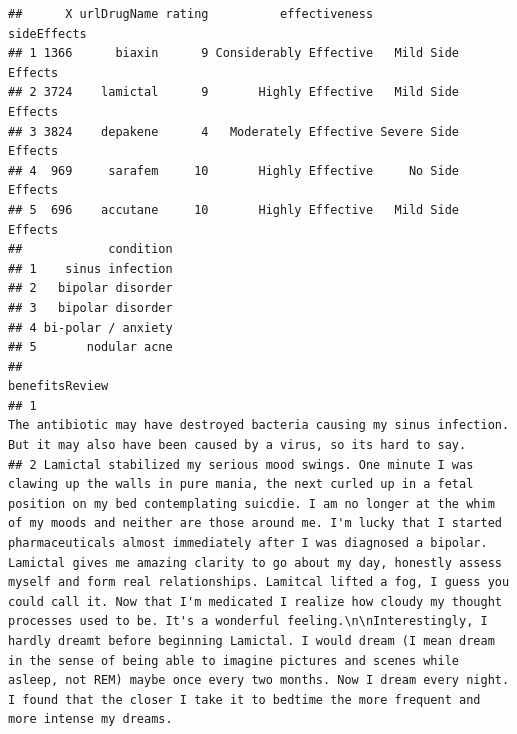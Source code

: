 \documentclass[spanish,]{article}
\begin{document}
\begin{verbatim}
##      X urlDrugName rating          effectiveness         sideEffects
## 1 1366      biaxin      9 Considerably Effective   Mild Side Effects
## 2 3724    lamictal      9       Highly Effective   Mild Side Effects
## 3 3824    depakene      4   Moderately Effective Severe Side Effects
## 4  969     sarafem     10       Highly Effective     No Side Effects
## 5  696    accutane     10       Highly Effective   Mild Side Effects
##            condition
## 1    sinus infection
## 2   bipolar disorder
## 3   bipolar disorder
## 4 bi-polar / anxiety
## 5       nodular acne
##                                                                                                                                                                                                                                                                                                                                                                                                                                                                                                                                                                                                                                                                                                                                                                                                                                                                                                                                benefitsReview
## 1                                                                                                                                                                                                                                                                                                                                                                                                                                                                                                                                                                                                                                                                                                                                                                                                    The antibiotic may have destroyed bacteria causing my sinus infection.  But it may also have been caused by a virus, so its hard to say.
## 2 Lamictal stabilized my serious mood swings. One minute I was clawing up the walls in pure mania, the next curled up in a fetal position on my bed contemplating suicdie. I am no longer at the whim of my moods and neither are those around me. I'm lucky that I started pharmaceuticals almost immediately after I was diagnosed a bipolar. Lamictal gives me amazing clarity to go about my day, honestly assess myself and form real relationships. Lamitcal lifted a fog, I guess you could call it. Now that I'm medicated I realize how cloudy my thought processes used to be. It's a wonderful feeling.\n\nInterestingly, I hardly dreamt before beginning Lamictal. I would dream (I mean dream in the sense of being able to imagine pictures and scenes while asleep, not REM) maybe once every two months. Now I dream every night. I found that the closer I take it to bedtime the more frequent and more intense my dreams.

\end{verbatim}
\end{document}
